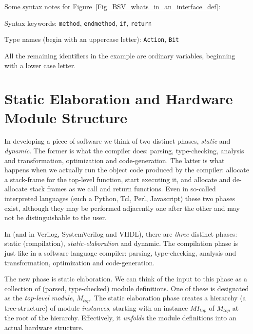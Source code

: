 Some syntax notes for Figure~\ref{Fig_BSV_whats_in_an_interface_def}:

\begin{tightlist}

 \item Syntax keywords: \verb|method|, \verb|endmethod|, \verb|if|, \verb|return|

 \item Type names (begin with an uppercase letter): \verb|Action|, \verb|Bit|

 \item All the remaining identifiers in the example are ordinary
       variables, beginning with a lower case letter.

\end{tightlist}


\section{Static Elaboration and Hardware Module Structure}

\label{Sec_Static_Elaboration}


In developing a piece of software we think of two distinct phases,
\emph{static} and \emph{dynamic}.  The former is what the compiler
does: parsing, type-checking, analysis and transformation,
optimization and code-generation.  The latter is what happens when we
actually run the object code produced by the compiler: allocate a
stack-frame for the top-level function, start executing it, and
allocate and de-allocate stack frames as we call and return functions.
Even in so-called interpreted languages (such a Python, Tcl, Perl,
Javascript) these two phases exist, although they may be performed
adjacently one after the other and may not be distinguishable to the
user.

In {\BSV} (and in Verilog, SystemVerilog and VHDL), there are
\emph{three} distinct phases: static (compilation),
\emph{static-elaboration} and dynamic.  The compilation phase is just
like in a software language compiler: parsing, type-checking, analysis
and transformation, optimization and code-generation.

The new phase is static elaboration.  We can think of the input to
this phase as a collection of (parsed, type-checked) module
definitions.  One of these is designated as the \emph{top-level
module}, $M_{top}$.  The static elaboration phase creates a hierarchy
(a tree-structure) of module \emph{instances}, starting with an
instance $MI_{top}$ of $M_{top}$ at the root of the hierarchy.
Effectively, it \emph{unfolds} the module definitions into an actual
hardware structure.

